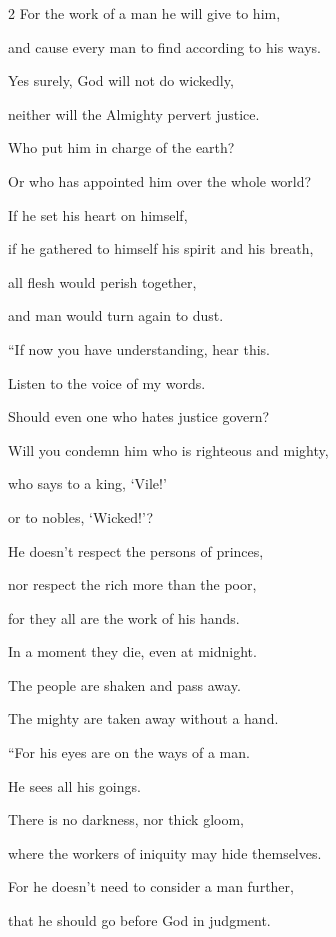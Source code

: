 \begin{multicols}{2}
	\myverse{}For the work of a man he will give to him,
	
	and cause every man to find according to his ways.
	
	\myverse{}Yes surely, God will not do wickedly,
	
	neither will the Almighty pervert justice.
	
	\myverse{}Who put him in charge of the earth?
	
	Or who has appointed him over the whole world?
	
	\myverse{}If he set his heart on himself,
	
	if he gathered to himself his spirit and his breath,
	
	\myverse{}all flesh would perish together,
	
	and man would turn again to dust.
	
	\vspace{\baselineskip}

	
	\myverse{}“If now you have understanding, hear this.
	
	Listen to the voice of my words.
	
	\myverse{}Should even one who hates justice govern?
	
	Will you condemn him who is righteous and mighty,
	
	\myverse{}who says to a king, ‘Vile!’
	
	or to nobles, ‘Wicked!’?
	
	\myverse{}He doesn’t respect the persons of princes,
	
	nor respect the rich more than the poor,
	
	for they all are the work of his hands.
	
	\myverse{}In a moment they die, even at midnight.
	
	The people are shaken and pass away.
	
	The mighty are taken away without a hand.
	
		\vspace{\baselineskip}
	
	
	\myverse{}“For his eyes are on the ways of a man.
	
	He sees all his goings.
	
	\myverse{}There is no darkness, nor thick gloom,
	
	where the workers of iniquity may hide themselves.
	
	\myverse{}For he doesn’t need to consider a man further,
	
	that he should go before God in judgment.
	

\end{multicols}
